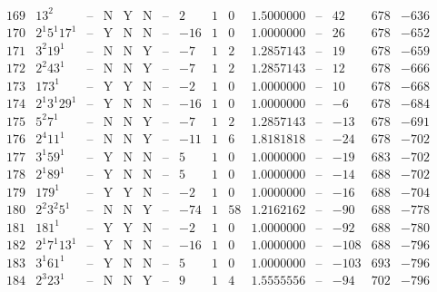\documentclass[11pt,reqno,a4letter]{article}
\numberwithin{figure}{section}
\numberwithin{table}{section}
\theoremstyle{plain}
\numberwithin{theorem}{section}
\theoremstyle{definition}
\begin{document}
\begin{table}[h!]
\begin{equation*}
{\begin{array}{|cc|c|ccc|c|c|ccc|c|ccc}
 169 & 13^2 & \text{--} & \text{N} & \text{Y} & \text{N} & \text{--} & 2 & 1 & 0 & 1.5000000 & \text{--} & 42 & 678 & -636 \\
 170 & 2^1 5^1 17^1 & \text{--} & \text{Y} & \text{N} & \text{N} & \text{--} & -16 & 1 & 0 & 1.0000000 & \text{--} & 26 & 678 & -652 \\
 171 & 3^2 19^1 & \text{--} & \text{N} & \text{N} & \text{Y} & \text{--} & -7 & 1 & 2 & 1.2857143 & \text{--} & 19 & 678 & -659 \\
 172 & 2^2 43^1 & \text{--} & \text{N} & \text{N} & \text{Y} & \text{--} & -7 & 1 & 2 & 1.2857143 & \text{--} & 12 & 678 & -666 \\
 173 & 173^1 & \text{--} & \text{Y} & \text{Y} & \text{N} & \text{--} & -2 & 1 & 0 & 1.0000000 & \text{--} & 10 & 678 & -668 \\
 174 & 2^1 3^1 29^1 & \text{--} & \text{Y} & \text{N} & \text{N} & \text{--} & -16 & 1 & 0 & 1.0000000 & \text{--} & -6 & 678 & -684 \\
 175 & 5^2 7^1 & \text{--} & \text{N} & \text{N} & \text{Y} & \text{--} & -7 & 1 & 2 & 1.2857143 & \text{--} & -13 & 678 & -691 \\
 176 & 2^4 11^1 & \text{--} & \text{N} & \text{N} & \text{Y} & \text{--} & -11 & 1 & 6 & 1.8181818 & \text{--} & -24 & 678 & -702 \\
 177 & 3^1 59^1 & \text{--} & \text{Y} & \text{N} & \text{N} & \text{--} & 5 & 1 & 0 & 1.0000000 & \text{--} & -19 & 683 & -702 \\
 178 & 2^1 89^1 & \text{--} & \text{Y} & \text{N} & \text{N} & \text{--} & 5 & 1 & 0 & 1.0000000 & \text{--} & -14 & 688 & -702 \\
 179 & 179^1 & \text{--} & \text{Y} & \text{Y} & \text{N} & \text{--} & -2 & 1 & 0 & 1.0000000 & \text{--} & -16 & 688 & -704 \\
 180 & 2^2 3^2 5^1 & \text{--} & \text{N} & \text{N} & \text{Y} & \text{--} & -74 & 1 & 58 & 1.2162162 & \text{--} & -90 & 688 & -778 \\
 181 & 181^1 & \text{--} & \text{Y} & \text{Y} & \text{N} & \text{--} & -2 & 1 & 0 & 1.0000000 & \text{--} & -92 & 688 & -780 \\
 182 & 2^1 7^1 13^1 & \text{--} & \text{Y} & \text{N} & \text{N} & \text{--} & -16 & 1 & 0 & 1.0000000 & \text{--} & -108 & 688 & -796 \\
 183 & 3^1 61^1 & \text{--} & \text{Y} & \text{N} & \text{N} & \text{--} & 5 & 1 & 0 & 1.0000000 & \text{--} & -103 & 693 & -796 \\
 184 & 2^3 23^1 & \text{--} & \text{N} & \text{N} & \text{Y} & \text{--} & 9 & 1 & 4 & 1.5555556 & \text{--} & -94 & 702 & -796 \\

\end{array}}
\end{equation*}
\end{table}
\end{document}
